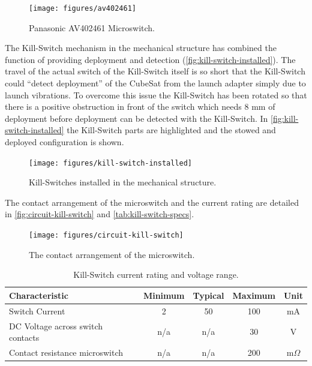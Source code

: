 \begin{figure}[!ht]
    \begin{center}
        \texttt{[image: figures/av402461]}
        \caption{Panasonic AV402461 Microswitch.}
        \label{fig:av402461}
    \end{center}
\end{figure}

The Kill-Switch mechanism in the mechanical structure has combined the function of providing deployment and detection (\autoref{fig:kill-switch-installed}). The travel of the actual switch of the Kill-Switch itself is so short that the Kill-Switch could ``detect deployment'' of the CubeSat from the launch adapter simply due to launch vibrations. To overcome this issue the Kill-Switch has been rotated so that there is a positive obstruction in front of the switch which needs 8 mm of deployment before deployment can be detected with the Kill-Switch. In \autoref{fig:kill-switch-installed} the Kill-Switch parts are highlighted and the stowed and deployed configuration is shown.

\begin{figure}[!ht]
    \begin{center}
        \texttt{[image: figures/kill-switch-installed]}
        \caption{Kill-Switches installed in the mechanical structure.}
        \label{fig:kill-switch-installed}
    \end{center}
\end{figure}

The contact arrangement of the microswitch and the current rating are detailed in \autoref{fig:circuit-kill-switch} and \autoref{tab:kill-switch-specs}.

\begin{figure}[!ht]
    \begin{center}
        \texttt{[image: figures/circuit-kill-switch]}
        \caption{The contact arrangement of the microswitch.}
        \label{fig:circuit-kill-switch}
    \end{center}
\end{figure}

\begin{table}[!h]
    \centering
    \begin{tabular}{lcccc}
        \toprule[1.5pt]
        \textbf{Characteristic} & \textbf{Minimum} & \textbf{Typical} & \textbf{Maximum} & \textbf{Unit} \\
        \midrule
        Switch Current                      & 2     & 50    & 100   & mA \\
        DC Voltage across switch contacts   & n/a   & n/a   & 30    & V \\
        Contact resistance microswitch      & n/a   & n/a   & 200   & m$\Omega$ \\
        \bottomrule[1.5pt]
    \end{tabular}
    \caption{Kill-Switch current rating and voltage range.}
    \label{tab:kill-switch-specs}
\end{table}

